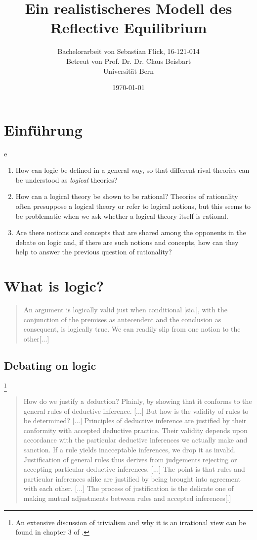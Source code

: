 \documentclass{article}
\title{Ein realistischeres Modell des Reflective Equilibrium}
\author{Bachelorarbeit von Sebastian Flick, 16-121-014\\Betreut von Prof. Dr. Dr. Claus Beisbart\\Universität Bern}
\date{\today}
\begin{document}
\maketitle
\section{Einführung}
e

\begin{enumerate}
    \item How can logic be defined in a general way, so that different rival theories can be understood as \textit{logical} theories?
    \item How can a logical theory be shown to be rational? Theories of rationality often presuppose a logical theory or refer to logical notions, but this seems to be problematic when we ask whether a logical theory itself is rational.
    \item Are there notions and concepts that are shared among the opponents in the debate on logic and, if there are such notions and concepts, how can they help to answer the previous question of rationality?
\end{enumerate}

 
\section{What is logic?}\label{sec:logic}

\begin{quote}
    An argument is logically valid just when conditional [sic.], with the conjunction of the premises as antecendent and the conclusion as consequent, is logically true. We can readily slip from one notion to the other[...] \cite[p.~13]{beallrestall}
\end{quote}

\subsection{Debating on logic}\label{sec:debating}
\footnote{An extensive discussion of trivialism and why it is an irrational view can be found in chapter 3 of .}

\begin{quote}\label{quote:goodman}
    How do we justify a \textit{de}duction? Plainly, by showing that it conforms to the general rules of deductive inference. [...] But how is the validity of rules to be determined? [...] Principles of deductive inference are justified by their conformity with accepted deductive practice. Their validity depends upon accordance with the particular deductive inferences we actually make and sanction. If a rule yields inacceptable inferences, we drop it as invalid. Justification of general rules thus derives from judgements rejecting or accepting particular deductive inferences. [...] The point is that rules and particular inferences alike are justified by being brought into agreement with each other. [...] The process of justification is the delicate one of making mutual adjustments between rules and accepted inferences[.] \cite[p. 63-64]{Goodman}
\end{quote}
\end{document}
